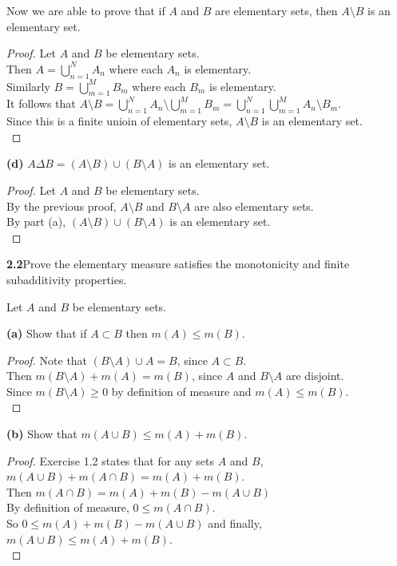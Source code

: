 \documentclass[12pt]{article}
\begin{document}
	Now we are able to prove that if $A$ and $B$ are elementary sets, then $A \setminus B$ is an elementary set. \\
	
	\begin{proof}
		Let $A$ and $B$ be elementary sets. \\
		Then $A = \bigcup\limits_{n=1}^{N} A_{n}$ where each $A_{n}$ is elementary. \\
		Similarly $B = \bigcup\limits_{m=1}^{M} B_{m}$ where each $B_{m}$ is elementary. \\
		It follows that $A \setminus B = \bigcup\limits_{n=1}^{N} A_{n} \setminus \bigcup\limits_{m=1}^{M} B_{m} = \bigcup\limits_{n=1}^{N}  \bigcup\limits_{m=1}^{M} A_{n} \setminus B_{m}$. \\
		Since this is a finite unioin of elementary sets, $A \setminus B$ is an elementary set. \\
	\end{proof}

\hspace{-4 ex}\textbf{(d)} $A \Delta B = (A \setminus B) \cup (B \setminus A)$ is an elementary set.
\begin{proof}
	Let $A$ and $B$ be elementary sets. \\
	By the previous proof, $A \setminus B$ and $B \setminus A$ are also elementary sets. \\
	By part (a), $(A \setminus B) \cup (B \setminus A)$ is an elementary set.\\
\end{proof}



\hspace{-4 ex}\textbf{2.2}Prove the elementary measure satisfies the monotonicity and finite subadditivity properties. \bigbreak

Let $A$ and $B$ be elementary sets. \bigbreak

\hspace{-4 ex}\textbf{(a)} Show that if $A \subset B$ then $m(A) \leq m(B)$. \bigbreak

\begin{proof}
	Note that $(B \setminus A) \cup A = B$, since $A \subset B$. \\
	Then $m(B \setminus A) + m(A) = m(B)$, since $A$ and $B \setminus A$ are disjoint. \\
	Since $m(B\setminus A) \geq 0$ by definition of measure and $m(A) \leq m(B)$.\\	
\end{proof}

\hspace{-4 ex}\textbf{(b)} Show that $m(A \cup B) \leq m(A) + m(B)$. \bigbreak

\begin{proof}
	Exercise 1.2 states that for any sets $A$ and $B$, \\ $m(A\cup B)+m(A\cap B)=m(A)+m(B)$. \\
	Then $m(A\cap B) = m(A) + m(B) - m(A\cup B)$ \\
	By definition of measure, $0 \leq m(A \cap B)$. \\
	So $0 \leq m(A) + m(B) - m(A\cup B)$ and finally, $m(A\cup B) \leq m(A)+m(B)$. \\
\end{proof}
\end{document}
